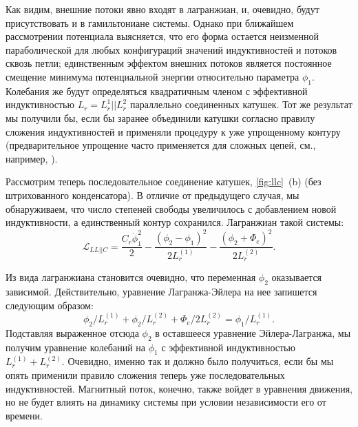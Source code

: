 \documentclass[14pt, a4paper]{extreport}
\numberwithin{equation}{section}
\begin{document}
Как видим, внешние потоки явно входят в лагранжиан, и, очевидно, будут присутствовать и в гамильтониане системы. Однако при ближайшем рассмотрении потенциала выясняется, что его форма остается неизменной параболической для любых конфигураций значений индуктивностей и потоков сквозь петли; единственным эффектом внешних потоков является постоянное смещение минимума потенциальной энергии относительно параметра $\phi_1$. Колебания же будут определяться квадратичным членом с эффективной индуктивностью $L_r = L_r^1 || L_r^2$ параллельно соединенных катушек. Тот же результат мы получили бы, если бы заранее объединили катушки согласно правилу сложения индуктивностей и применяли процедуру к уже упрощенному контуру (предварительное упрощение часто применяется для сложных цепей, см., например, \cite{koch2007charge}). 

Рассмотрим теперь последовательное соединение катушек, \autoref{fig:llc}~(b) (без штрихованного конденсатора). В отличие от предыдущего случая, мы обнаруживаем, что число степеней свободы увеличилось с добавлением новой индуктивности, а единственный контур сохранился. Лагранжиан такой системы:
\begin{equation}
	\mathcal{L}_{LL||C} = \frac{C_r \dot\phi_1^2}{2} - \frac{(\phi_2 - \phi_1)^2}{2L_r^{(1)}} - \frac{\left(\phi_2+\Phi_e\right)^2}{2 L_r^{(2)}}.\label{eq:ll||c}
\end{equation}

Из вида лагранжиана становится очевидно, что переменная $\phi_2$ оказывается зависимой. Действительно, уравнение Лагранжа-Эйлера на нее запишется следующим образом:
\begin{equation}
	\phi_2/L_r^{(1)} + \phi_2/L_r^{(2)} + \Phi_e/2L_r^{(2)} = \phi_1/L_r^{(1)}.
\end{equation}
Подставляя выраженное отсюда $\phi_2$ в оставшееся уравнение Эйлера-Лагранжа, мы получим уравнение колебаний на $\phi_1$ с эффективной индуктивностью $L_r^{(1)} + L_r^{(2)}$. Очевидно, именно так и должно было получиться, если бы мы опять применили правило сложения теперь уже последовательных индуктивностей. Магнитный поток, конечно, также войдет в уравнения движения, но не будет влиять на динамику системы при условии независимости его от времени. 
\end{document}
